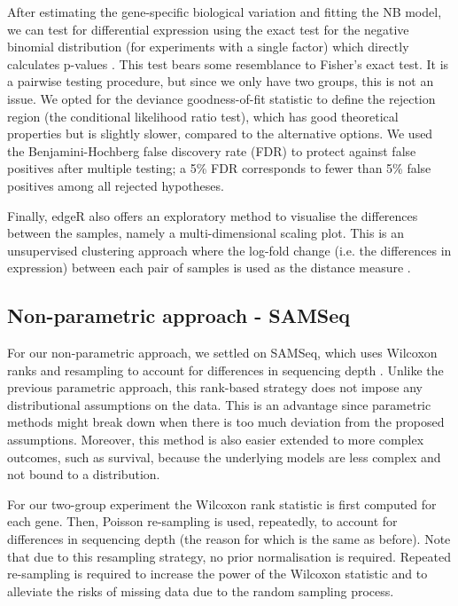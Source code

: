 \documentclass[a4paper,10pt]{article}\usepackage[]{graphicx}\usepackage[]{color}
\begin{document}
After estimating the gene-specific biological variation and fitting the NB model, we can test for differential expression using the exact test for the negative binomial distribution (for experiments with a single factor) which directly calculates p-values \autocite{chen_edger_2015,robinson_smallsample_2008}. This test bears some resemblance to Fisher's exact test. It is a pairwise testing procedure, but since we only have two groups, this is not an issue. We opted for the deviance goodness-of-fit statistic to define the rejection region (the conditional likelihood ratio test), which has good theoretical properties but is slightly slower, compared to the alternative options. We used the Benjamini-Hochberg false discovery rate (FDR) to protect against false positives after multiple testing; a 5\% FDR corresponds to fewer than 5\% false positives among all rejected hypotheses.

Finally, edgeR also offers an exploratory method to visualise the differences between the samples, namely a multi-dimensional scaling plot. This is an unsupervised clustering approach where the log-fold change (i.e. the differences in expression) between each pair of samples is used as the distance measure \autocite{chen_edger_2015}. 

\subsection{Non-parametric approach - SAMSeq}
For our non-parametric approach, we settled on SAMSeq, which uses Wilcoxon ranks and resampling to account for differences in sequencing depth \autocite{li_finding_2013}. Unlike the previous parametric approach, this rank-based strategy does not impose any distributional assumptions on the data. This is an advantage since parametric methods might break down when there is too much deviation from the proposed assumptions. Moreover, this method is also easier extended to more complex outcomes, such as survival, because the underlying models are less complex and not bound to a distribution.

For our two-group experiment the Wilcoxon rank statistic is first computed for each gene. Then, Poisson re-sampling is used, repeatedly, to account for differences in sequencing depth (the reason for which is the same as before). Note that due to this resampling strategy, no prior normalisation is required. Repeated re-sampling is required to increase the power of the Wilcoxon statistic and to alleviate the risks of missing data due to the random sampling process.
\end{document}
